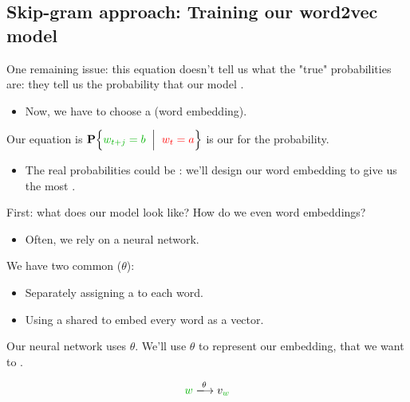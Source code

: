     \phantom{}

    \subsection{Skip-gram approach: Training our word2vec model}

        One remaining issue: this equation doesn't tell us what the "true" probabilities are: they tell us the probability that our model .
        
        \begin{itemize}
            \item Now, we have to choose a  (word embedding).\\
        \end{itemize}
        
        \begin{clarification}
            Our equation is $\given{ \grn{w_{t+j} = b} }{ \red{w_t=a} }$ is our  for the probability.

            \begin{itemize}
                \item The real probabilities could be : we'll design our word embedding to give us the most .
            \end{itemize}
        \end{clarification}

        First: what does our model look like? How do we even  word embeddings?

        \begin{itemize}
            \item Often, we rely on a neural network.\\
        \end{itemize}

        \begin{definition}
           We have two common  ($\theta$):

            \begin{itemize}
                \item Separately assigning a  to each word.
                \item Using a shared  to embed every word as a vector.
            \end{itemize}

            Our neural network uses  $\theta$. We'll use $\theta$ to represent our embedding, that we want to .

            \begin{equation*}
                \grn{w} \xlongrightarrow{\theta} v_{\grn{w}}
            \end{equation*}
        \end{definition}

